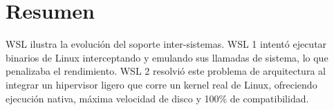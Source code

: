 \documentclass{article}
\begin{document}
\section{Resumen}
\label{sec:orgc1f966c}
WSL ilustra la evolución del soporte inter-sistemas. WSL 1 intentó
ejecutar binarios de Linux interceptando y emulando sus llamadas de
sistema, lo que penalizaba el rendimiento. WSL 2 resolvió este
problema de arquitectura al integrar un hipervisor ligero que corre un
kernel real de Linux, ofreciendo ejecución nativa, máxima velocidad de
disco y 100\% de compatibilidad.
\end{document}
